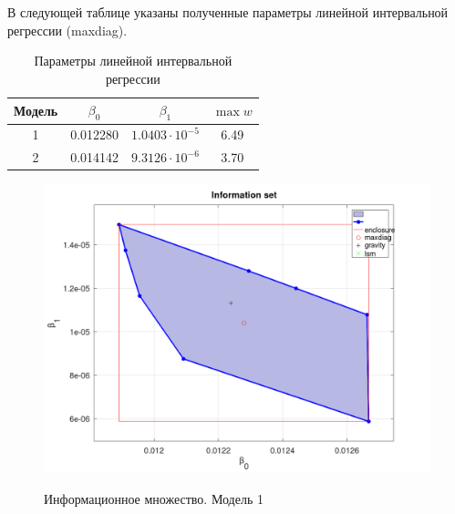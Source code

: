 В следующей таблице указаны полученные параметры линейной интервальной регрессии (maxdiag).

\begin{table}[H]
	\begin{center}
		\begin{tabular}{|c|c|c|c|}
			\hline
			Модель & $\beta_0$ & $\beta_1$ & $\max w$ \\
			\hline
			1 & 0.012280 & $1.0403 \cdot 10^{-5}$ & 6.49 \\
			\hline
			2 & 0.014142 & $9.3126 \cdot 10^{-6}$ & 3.70 \\
			\hline
		\end{tabular}
		\caption{Параметры линейной интервальной регрессии}
	\end{center}
\end{table}

\begin{figure}[H]
	\begin{center}
		\includegraphics[scale=0.32]{info_set_full_1}
		\label{pic:infoset1}
		\caption{Информационное множество. Модель 1}
	\end{center}
\end{figure}

